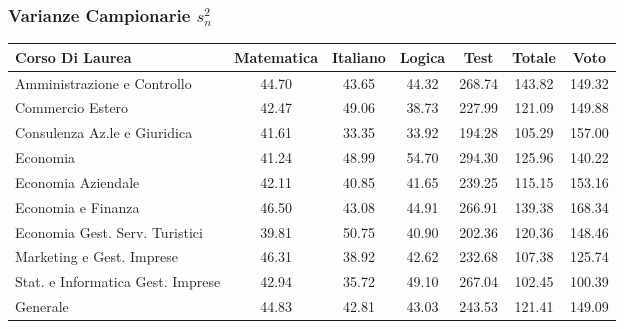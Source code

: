 \subsubsection{Varianze Campionarie $s^2_n$}
\begin{center}
\begin{tabular}{lcccccc}
  \toprule
  Corso Di Laurea & Matematica & Italiano & Logica & Test & Totale & Voto \\ 
  \midrule
  Amministrazione e Controllo & 44.70 & 43.65 & 44.32 & 268.74 & 143.82 & 149.32 \\ 
  Commercio Estero & 42.47 & 49.06 & 38.73 & 227.99 & 121.09 & 149.88 \\ 
  Consulenza Az.le e Giuridica & 41.61 & 33.35 & 33.92 & 194.28 & 105.29 & 157.00 \\ 
  Economia & 41.24 & 48.99 & 54.70 & 294.30 & 125.96 & 140.22 \\ 
  Economia Aziendale & 42.11 & 40.85 & 41.65 & 239.25 & 115.15 & 153.16 \\ 
  Economia e Finanza & 46.50 & 43.08 & 44.91 & 266.91 & 139.38 & 168.34 \\ 
  Economia Gest. Serv. Turistici & 39.81 & 50.75 & 40.90 & 202.36 & 120.36 & 148.46 \\ 
  Marketing e Gest. Imprese & 46.31 & 38.92 & 42.62 & 232.68 & 107.38 & 125.74 \\ 
  Stat. e Informatica Gest. Imprese & 42.94 & 35.72 & 49.10 & 267.04 & 102.45 & 100.39 \\ 
  \addlinespace
  Generale & 44.83 & 42.81 & 43.03 & 243.53 & 121.41 & 149.09 \\ 
  \bottomrule
\end{tabular}
\end{center}

